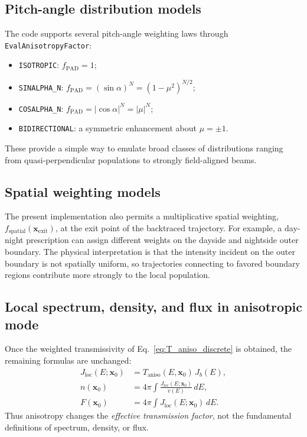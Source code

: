 \documentclass[11pt]{article}
\begin{document}
\subsection{Pitch-angle distribution models}
The code supports several pitch-angle weighting laws through
\texttt{EvalAnisotropyFactor}:
\begin{itemize}
  \item \texttt{ISOTROPIC}: $f_{\mathrm{PAD}}=1$;
  \item \texttt{SINALPHA\_N}: $f_{\mathrm{PAD}}=(\sin\alpha)^N=(1-\mu^2)^{N/2}$;
  \item \texttt{COSALPHA\_N}: $f_{\mathrm{PAD}}=|\cos\alpha|^N=|\mu|^N$;
  \item \texttt{BIDIRECTIONAL}: a symmetric enhancement about $\mu=\pm 1$.
\end{itemize}
These provide a simple way to emulate broad classes of distributions ranging from
quasi-perpendicular populations to strongly field-aligned beams.

\subsection{Spatial weighting models}
The present implementation also permits a multiplicative spatial weighting,
$ f_{\mathrm{spatial}}(\bm{x}_{\mathrm{exit}})$, at the exit point of the
backtraced trajectory. For example, a day-night prescription can assign different
weights on the dayside and nightside outer boundary. The physical interpretation
is that the intensity incident on the outer boundary is not spatially uniform,
so trajectories connecting to favored boundary regions contribute more strongly to
the local population.

\subsection{Local spectrum, density, and flux in anisotropic mode}
Once the weighted transmissivity of Eq.~\eqref{eq:T_aniso_discrete} is obtained,
the remaining formulas are unchanged:
\begin{align}
  J_{\mathrm{loc}}(E;\bm{x}_0) &= T_{\mathrm{aniso}}(E,\bm{x}_0)\,J_b(E), \\
  n(\bm{x}_0) &= 4\pi\int \frac{J_{\mathrm{loc}}(E;\bm{x}_0)}{v(E)}\,dE, \\
  F(\bm{x}_0) &= 4\pi\int J_{\mathrm{loc}}(E;\bm{x}_0)\,dE.
\end{align}
Thus anisotropy changes the \emph{effective transmission factor}, not the
fundamental definitions of spectrum, density, or flux.
\end{document}
